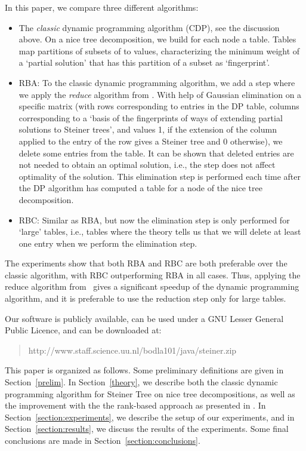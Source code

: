 \documentclass{llncs}
\begin{document}
In this paper, we compare three different algorithms:
\begin{itemize}
\item The {\em classic} dynamic programming algorithm (CDP), see the discussion above. On a nice tree decomposition,
we build for each node  a table. Tables map partitions of subsets of  to values,
characterizing the minimum weight of a `partial solution' that has this partition of a subset
as `fingerprint'. 
\item RBA: To the classic dynamic programming algorithm, we add a step where we
apply the {\em reduce} algorithm from \cite{BodlaenderCKN12}. With help of Gaussian elimination
on a specific matrix (with rows corresponding to entries in the DP table, columns
corresponding to a `basis of the fingerprints of ways of extending partial solutions to
Steiner trees', and values 1, if the extension of the column applied to the entry of the row
gives a Steiner tree and 0 otherwise), we delete some entries from the table. It can be
shown that deleted entries are not needed to obtain an optimal solution, i.e., the
step does not affect optimality of the solution. This elimination step is performed each
time after the DP algorithm has computed a table for a node of the nice tree decomposition.
\item RBC: Similar as RBA, but now the elimination step is only performed for `large'
tables, i.e., tables where the theory tells us that we will delete at least one entry when
we perform the elimination step.
\end{itemize}

The experiments show that both RBA and RBC are both preferable over
the classic algorithm, with RBC outperforming RBA in all cases. Thus, applying
the reduce algorithm from~\cite{BodlaenderCKN12} gives a significant speedup of the
dynamic programming algorithm, and it is preferable to use the reduction step only
for large tables.






Our software is publicly available, can be used under a GNU Lesser General Public Licence,
and can be downloaded at:
\begin{verse}
http://www.staff.science.uu.nl/bodla101/java/steiner.zip
\end{verse}

This paper is organized as follows.
Some preliminary definitions are given in Section~\ref{prelim}. 
In Section~\ref{theory}, we describe both the classic dynamic
programming algorithm for Steiner
Tree on nice tree decompositions, as well as the improvement with the
 the rank-based approach as presented in \cite{BodlaenderCKN12}. 
In Section~\ref{section:experiments}, we describe the setup of our experiments,
and in Section~\ref{section:results}, we discuss the results of the experiments.
Some final conclusions are made in Section~\ref{section:conclusions}.
\end{document}
